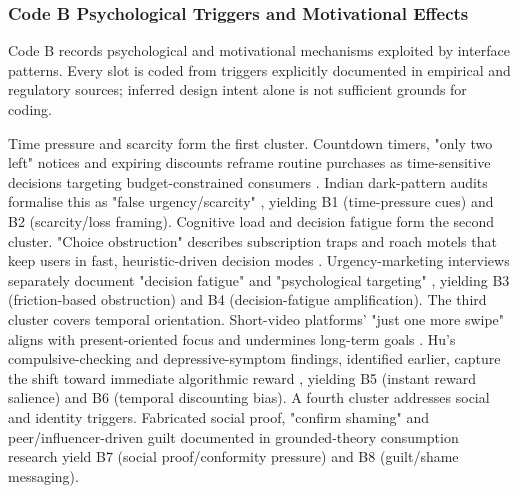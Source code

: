 \documentclass[11pt]{article}
\begin{document}
\subsubsection{Code B Psychological Triggers and Motivational Effects}
\label{sec:codeB_psych_triggers} Code B records psychological and motivational mechanisms exploited by interface patterns. Every slot is coded from triggers explicitly documented in empirical and regulatory sources; inferred design intent alone is not sufficient grounds for coding.

Time pressure and scarcity form the first cluster. Countdown timers, "only two left" notices and expiring discounts reframe routine purchases as time-sensitive decisions targeting budget-constrained consumers \parencites[136]{8745065}. Indian dark-pattern audits formalise this as "false urgency/scarcity" \parencites[7]{6295677}, yielding B1 (time-pressure cues) and B2 (scarcity/loss framing). Cognitive load and decision fatigue form the second cluster. "Choice obstruction" describes subscription traps and roach motels that keep users in fast, heuristic-driven decision modes \parencites[6]{6295677}. Urgency-marketing interviews separately document "decision fatigue" and "psychological targeting" \parencites{8745065}, yielding B3 (friction-based obstruction) and B4 (decision-fatigue amplification). The third cluster covers temporal orientation. Short-video platforms' "just one more swipe" aligns with present-oriented focus and undermines long-term goals \parencites[2]{8958037}[3]{8958037}. Hu's compulsive-checking and depressive-symptom findings, identified earlier, capture the shift toward immediate algorithmic reward \parencites[2]{3303310}[20]{3303310}, yielding B5 (instant reward salience) and B6 (temporal discounting bias). A fourth cluster addresses social and identity triggers. Fabricated social proof, "confirm shaming" \parencites[7]{6295677} and peer/influencer-driven guilt documented in grounded-theory consumption research \parencites{4245543} yield B7 (social proof/conformity pressure) and B8 (guilt/shame messaging).
\end{document}
